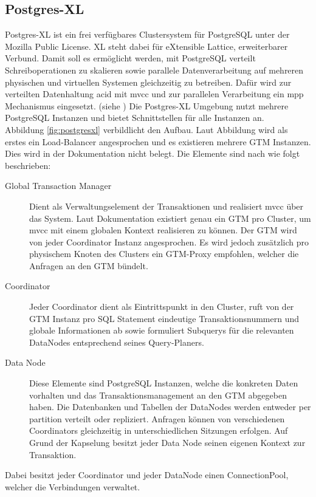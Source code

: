 \subsection{Postgres-XL}
\label{grundlagen:postgresxl}
Postgres-XL ist ein frei verfügbares Clustersystem für PostgreSQL unter der Mozilla Public License.
XL steht dabei für eXtensible Lattice, erweiterbarer Verbund.
Damit soll es ermöglicht werden, mit PostgreSQL verteilt Schreiboperationen zu skalieren sowie parallele Datenverarbeitung auf mehreren physischen und virtuellen Systemen gleichzeitig zu betreiben.
Dafür wird zur verteilten Datenhaltung \Gls{acid} mit \Gls{mvcc} und zur parallelen Verarbeitung ein \Gls{mpp} Mechanismus eingesetzt. (siehe \cite{website:postgresxl-about})
Die Postgres-XL Umgebung nutzt mehrere PostgreSQL Instanzen und bietet Schnittstellen für alle Instanzen an.\\
Abbildung \ref{fig:postgresxl} verbildlicht den Aufbau.
Laut Abbildung wird als erstes ein Load-Balancer angesprochen und es existieren mehrere GTM Instanzen.
Dies wird in der Dokumentation nicht belegt.
Die Elemente sind nach \cite{website:postgresxl-about} wie folgt beschrieben:
\begin{description}
\item[Global Transaction Manager] Dient als Verwaltungselement der Transaktionen und realisiert \Gls{mvcc} über das System. Laut Dokumentation existiert genau ein GTM pro Cluster, um \Gls{mvcc}  mit einem globalen Kontext realisieren zu können. Der GTM wird von jeder Coordinator Instanz angesprochen. Es wird jedoch zusätzlich pro physischem Knoten des Clusters ein GTM-Proxy empfohlen, welcher die Anfragen an den GTM bündelt.
\item[Coordinator] Jeder Coordinator dient als Eintrittspunkt in den Cluster, ruft von der GTM Instanz pro SQL Statement eindeutige Transaktionsnummern und globale Informationen ab sowie formuliert Subquerys für die relevanten DataNodes entsprechend seines Query-Planers.
\item[Data Node] Diese Elemente sind PostgreSQL Instanzen, welche die konkreten Daten vorhalten und das Transaktionsmanagement an den GTM abgegeben haben. Die Datenbanken und Tabellen der DataNodes werden entweder per partition verteilt oder repliziert. Anfragen können von verschiedenen Coordinators gleichzeitig in unterschiedlichen Sitzungen erfolgen. Auf Grund der Kapselung besitzt jeder Data Node seinen eigenen Kontext zur Transaktion.
\end{description}
Dabei besitzt jeder Coordinator und jeder DataNode einen ConnectionPool, welcher die Verbindungen verwaltet.
